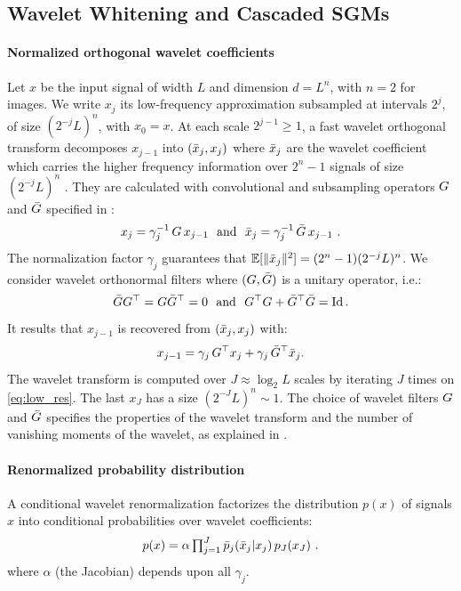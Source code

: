 \documentclass{article}
\begin{document}
\subsection{Wavelet Whitening and Cascaded SGMs}
\label{sec:whit-with-wavel}

\paragraph{Normalized orthogonal wavelet coefficients}
Let $x$ be the input signal of width $L$ and dimension $d = L^n$, with $n=2$ for
images.  We write $x_j$ its low-frequency
approximation subsampled at intervals $2^j$, of size $(2^{-j} L)^n$, with
$x_0 = x$.  At each scale $2^{j-1} \geq 1$, a fast wavelet orthogonal transform
decomposes $x_{j-1}$ into $({\bar x}_j , x_j)$ where ${\bar x}_j$ are the wavelet
coefficient which carries the higher frequency information over $2^{n}-1$
signals of size $(2^{-j} L)^n$ \cite{mallat1999wavelet}.  They are calculated
with convolutional and subsampling operators $G$ and ${\bar {G}}$ specified in
:
\begin{equation}
  \label{eq:low_res}
  \textstyle{
    x_j = \gamma_j^{-1}\, G\, x_{j-1} ~~\mbox{and}~~
    {\bar x}_j = \gamma_j^{-1}\, {\bar {G}}\, x_{j-1} ~.
    }
\end{equation}
The normalization factor $\gamma_j$ guarantees that 
${\mathbb E}[\|{\bar x}_j \|^2] = (2^n-1) (2^{-j} L)^n$.  We consider wavelet
orthonormal filters where $(G,\bar{G})$ is a unitary operator, i.e.:
\[
{\bar {G}}G^\top = G{\bar {G}}^\top = 0~~\mbox{and}~~G^\top G + {\bar {G}}^\top{\bar {G}} = \operatorname{Id} .
\]
It results that $x_{j-1}$ is recovered from $({\bar x}_j,x_j)$ with:
\begin{equation}
  \label{eq:reconstruction_UNO}
x_{j-1} = \gamma_j \, G^\top x_j + \gamma_j \, {\bar {G}}^\top {\bar x}_j .
\end{equation}
The wavelet transform is computed over $J \approx \log_2 L$ scales by iterating
$J$ times on \eqref{eq:low_res}. The last $x_J$ has a size
$(2^{-J} L)^n \sim 1$.  The choice of wavelet
filters $G$ and ${\bar {G}}$ specifies the properties of the wavelet transform and
the number of vanishing moments of the wavelet, as explained in 
.


\paragraph{Renormalized probability distribution}
A conditional wavelet renormalization 
factorizes the distribution $p(x)$ of signals $x$ into conditional probabilities over wavelet coefficients:
\begin{equation}
  \label{product}
  \textstyle{
    p(x) =  \alpha \prod_{j=1}^{J} \bar p_j ({\bar x}_j | x_j)\, p_{J} (x_{J})~.
    }
\end{equation}
where $\alpha$ (the Jacobian) depends upon all $\gamma_j$.
\end{document}
